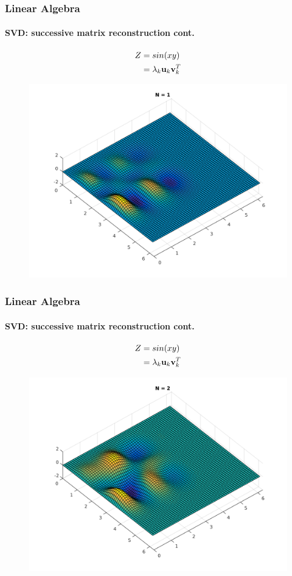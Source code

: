 \documentclass[hyperref={pdfpagelabels=true}]{beamer}
\begin{document}
\begin{frame}
\frametitle{Linear Algebra}
\framesubtitle{SVD: successive matrix reconstruction {\tiny cont.}}
\small{
\begin{center}
\begin{align*}
Z &= sin(xy) \\
  &= \lambda_k{\bf u}_k {\bf v}_k^T
\end{align*} 
\end{center}}
\begin{figure}[!htb]
\centering
\includegraphics [scale=0.415]{as/a1.png}
\end{figure}
\end{frame}


\begin{frame}
\frametitle{Linear Algebra}
\framesubtitle{SVD: successive matrix reconstruction {\tiny cont.}}
\small{ 
\begin{center}
\begin{align*}
Z &= sin(xy) \\
  &= \lambda_k{\bf u}_k {\bf v}_k^T
\end{align*}
\end{center}}
\begin{figure}[!htb]
\centering
\includegraphics [scale=0.415]{as/a2.png}
\end{figure}
\end{frame}
\end{document}
